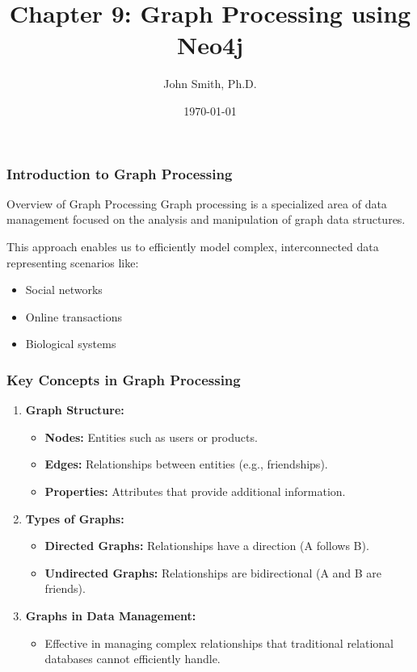 \documentclass[aspectratio=169]{beamer}
\title[Graph Processing using Neo4j]{Chapter 9: Graph Processing using Neo4j}
\author[J. Smith]{John Smith, Ph.D.}
\institute[University Name]{
  Department of Computer Science\\
  University Name\\
  \vspace{0.3cm}
  Email: email@university.edu\\
  Website: www.university.edu
}
\date{\today}
\begin{document}
\frame{\titlepage}

\begin{frame}[fragile]
    \frametitle{Introduction to Graph Processing}
    \begin{block}{Overview of Graph Processing}
        Graph processing is a specialized area of data management focused on the analysis and manipulation of graph data structures.
    \end{block}
    This approach enables us to efficiently model complex, interconnected data representing scenarios like:
    \begin{itemize}
        \item Social networks
        \item Online transactions
        \item Biological systems
    \end{itemize}
\end{frame}

\begin{frame}[fragile]
    \frametitle{Key Concepts in Graph Processing}
    \begin{enumerate}
        \item \textbf{Graph Structure:}
        \begin{itemize}
            \item \textbf{Nodes:} Entities such as users or products.
            \item \textbf{Edges:} Relationships between entities (e.g., friendships).
            \item \textbf{Properties:} Attributes that provide additional information.
        \end{itemize}
        
        \item \textbf{Types of Graphs:}
        \begin{itemize}
            \item \textbf{Directed Graphs:} Relationships have a direction (A follows B).
            \item \textbf{Undirected Graphs:} Relationships are bidirectional (A and B are friends).
        \end{itemize}
        
        \item \textbf{Graphs in Data Management:}
        \begin{itemize}
            \item Effective in managing complex relationships that traditional relational databases cannot efficiently handle.
        \end{itemize}
    \end{enumerate}  
\end{frame}
\end{document}
